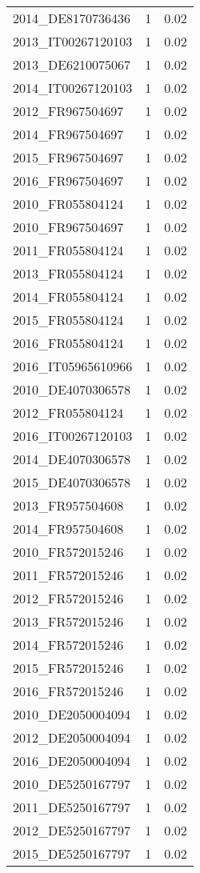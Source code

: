 \begin{table*}[htbp]
\begin{tabular}{lrr}
2014_DE8170736436 & 1 & 0.02 \\
2013_IT00267120103 & 1 & 0.02 \\
2013_DE6210075067 & 1 & 0.02 \\
2014_IT00267120103 & 1 & 0.02 \\
2012_FR967504697 & 1 & 0.02 \\
2014_FR967504697 & 1 & 0.02 \\
2015_FR967504697 & 1 & 0.02 \\
2016_FR967504697 & 1 & 0.02 \\
2010_FR055804124 & 1 & 0.02 \\
2010_FR967504697 & 1 & 0.02 \\
2011_FR055804124 & 1 & 0.02 \\
2013_FR055804124 & 1 & 0.02 \\
2014_FR055804124 & 1 & 0.02 \\
2015_FR055804124 & 1 & 0.02 \\
2016_FR055804124 & 1 & 0.02 \\
2016_IT05965610966 & 1 & 0.02 \\
2010_DE4070306578 & 1 & 0.02 \\
2012_FR055804124 & 1 & 0.02 \\
2016_IT00267120103 & 1 & 0.02 \\
2014_DE4070306578 & 1 & 0.02 \\
2015_DE4070306578 & 1 & 0.02 \\
2013_FR957504608 & 1 & 0.02 \\
2014_FR957504608 & 1 & 0.02 \\
2010_FR572015246 & 1 & 0.02 \\
2011_FR572015246 & 1 & 0.02 \\
2012_FR572015246 & 1 & 0.02 \\
2013_FR572015246 & 1 & 0.02 \\
2014_FR572015246 & 1 & 0.02 \\
2015_FR572015246 & 1 & 0.02 \\
2016_FR572015246 & 1 & 0.02 \\
2010_DE2050004094 & 1 & 0.02 \\
2012_DE2050004094 & 1 & 0.02 \\
2016_DE2050004094 & 1 & 0.02 \\
2010_DE5250167797 & 1 & 0.02 \\
2011_DE5250167797 & 1 & 0.02 \\
2012_DE5250167797 & 1 & 0.02 \\
2015_DE5250167797 & 1 & 0.02 \\

\end{tabular}
\end{table*}
